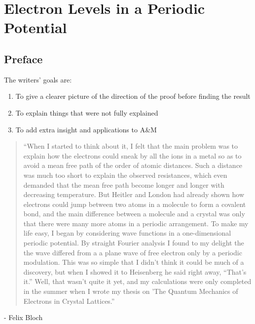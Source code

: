 \chapter{Electron Levels in a Periodic Potential}

\listoftodos

\section{Preface}



The writers' goals are:
\begin{enumerate}
	\item To give a clearer picture of the direction of the proof before finding the result
	\item To explain things that were not fully explained
	\item To add extra insight and applications to A\&M
\end{enumerate}


\begin{quotation}
	``When I started to think about it, I felt that the main problem was to explain how the electrons could sneak by all the ions in a metal so as to avoid a mean free path of the order of atomic distances. Such a distance was much too short to explain the observed resistances, which even demanded that the mean free path become longer and longer with decreasing temperature. But Heitler and London had already shown how electrons could jump between two atoms in a molecule to form a covalent bond, and the main difference between a molecule and a crystal was only that there were many more atoms in a periodic arrangement. To make my life easy, I began by considering wave functions in a one-dimensional periodic potential. By straight Fourier analysis I found to my delight the the wave differed from a a plane wave of free electron only by a periodic modulation.
	This was so simple that I didn’t think it could be much of a discovery, but when I showed it to Heisenberg he said right away, “That’s it.” Well, that wasn’t quite it yet, and my calculations were only completed in the summer when I wrote my thesis on 'The Quantum Mechanics of Electrons in Crystal Lattices.''
\end{quotation}
- Felix Bloch


